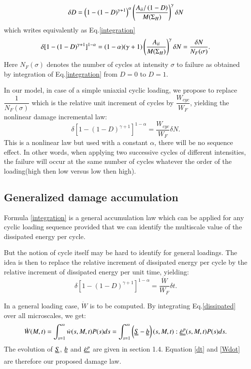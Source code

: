 \documentclass[3p,times,number,review]{elsarticle}
\begin{document}
 \begin{equation}\delta D = \left( 1 -(1-D)^{\gamma+1}\right)^\alpha \left(\frac{{A}_{\uppercase\expandafter{\romannumeral2}}/\left( 1-D\right) }{M(\Sigma_H)}\right)^\gamma \delta N
 \label{chabochemulti}
 \end{equation} 
 which writes equivalently as Eq.\eqref{integration}
   \begin{equation}\delta [1-(1-D)^{\gamma+1}]^{1-\alpha}=(1-\alpha)(\gamma+1)\left(\dfrac{{A}_{\uppercase\expandafter{\romannumeral2}} }{M(\Sigma_H)}\right)^\gamma \delta N=\dfrac{\delta N}{N_F(\sigma)}.
   \label{integration}
   \end{equation}
Here $N_F(\sigma)$ denotes the number of cycles at intensity $\sigma$ to failure as obtained by integration of Eq.\eqref{integration} from $D=0$ to $D=1$.

In our model, in case of a simple uniaxial cyclic loading, we propose to replace $\dfrac{1}{N_F(\sigma)}$ which is the relative unit increment of cycles by $\dfrac{W_{cyc}}{W_F}$, yielding the nonlinear damage incremental law:
	\begin{equation}
	\delta[1-(1-D)^{\gamma+1}]^{1-\alpha}=\dfrac{W_{cyc}}{W_F}\delta N.
\label{integrationW}
\end{equation}
This is a nonlinear law but used with a constant $\alpha$, there will be no sequence effect. In other words,
 when applying two successive cycles of different intensities, the failure will occur at the same number of cycles whatever the order of the loading(high then low versus low then high).
 
\subsection{Generalized damage accumulation}
Formula \eqref{integration} is a general accumulation law which can be applied for any cyclic loading sequence provided that we can identify the multiscale value of the dissipated energy per cycle. 

But the notion of cycle itself may be hard to identify for general loadings. The idea is then to replace the relative increment of dissipated energy per cycle by the relative increment of dissipated energy per unit time, yielding:
\begin{equation}
\delta [1-(1-D)^{\gamma+1}]^{1-\alpha}=\dfrac{\dot{W}}{W_F}\delta t.
\label{dt}
\end{equation}

In a general loading case, $\dot{W}$ is to be computed. By integrating Eq.\eqref{dissipated} over all microscales, we get:
\begin{equation}\dot{W}(M,t)=\int_{s=1}^{\infty}\dot{w}(s,M,t)P(s)ds=\int_{s=1}^{\infty}\left(\uuline{S}-\uuline{b} \right) (s,M,t):\uuline{\dot{\varepsilon}^p}(s,M,t)P(s)ds.\label{Wdot}
\end{equation}
The evolution of $\uuline{S}$, $\uuline{b}$ and $\uuline{\dot{\varepsilon}^p}$ are given in section 1.4. Equation \eqref{dt} and \eqref{Wdot} are therefore our proposed damage law.
\end{document}
